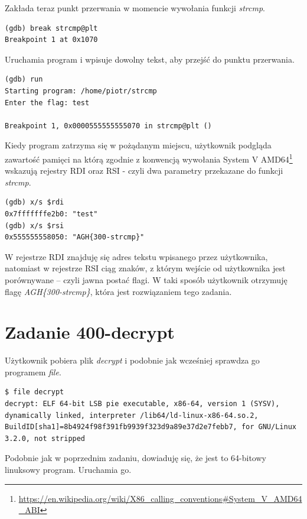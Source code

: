 \documentclass[language=polish,type=eng]{aghmodern}
\begin{document}
Zakłada teraz punkt przerwania w momencie wywołania funkcji \emph{strcmp}.

\begin{verbatim}
(gdb) break strcmp@plt
Breakpoint 1 at 0x1070
\end{verbatim}

Uruchamia program i wpisuje dowolny tekst, aby przejść do punktu przerwania.

\begin{verbatim}
(gdb) run
Starting program: /home/piotr/strcmp 
Enter the flag: test

Breakpoint 1, 0x0000555555555070 in strcmp@plt ()
\end{verbatim}

Kiedy program zatrzyma się w pożądanym miejscu, użytkownik podgląda zawartość pamięci na którą
zgodnie z konwencją wywołania System V AMD64\footnote{
\url{https://en.wikipedia.org/wiki/X86_calling_conventions\#System_V_AMD64_ABI}}
wskazują rejestry RDI oraz RSI - czyli dwa parametry przekazane do funkcji \emph{strcmp}.

\begin{verbatim}
(gdb) x/s $rdi
0x7fffffffe2b0: "test"
(gdb) x/s $rsi
0x555555558050: "AGH{300-strcmp}"
\end{verbatim}

W rejestrze RDI znajduję się adres tekstu wpisanego przez użytkownika, natomiast
w rejestrze RSI ciąg znaków, z którym wejście od użytkownika jest porównywane -- czyli
jawna postać flagi. W taki sposób użytkownik otrzymuję flagę \emph{AGH\{300-strcmp\}},
która jest rozwiązaniem tego zadania.

\section{Zadanie 400-decrypt}

Użytkownik pobiera plik \emph{decrypt} i podobnie jak wcześniej sprawdza go programem \emph{file}.

\begin{verbatim}
$ file decrypt
decrypt: ELF 64-bit LSB pie executable, x86-64, version 1 (SYSV), dynamically linked, interpreter /lib64/ld-linux-x86-64.so.2, BuildID[sha1]=8b4924f98f391fb9939f323d9a89e37d2e7febb7, for GNU/Linux 3.2.0, not stripped
\end{verbatim}

Podobnie jak w poprzednim zadaniu, dowiaduję się, że jest to 64-bitowy linuksowy program.
Uruchamia go.
\end{document}
